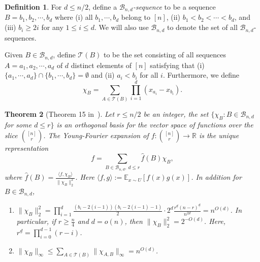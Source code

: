 \documentclass[11pt]{article}
\numberwithin{equation}{section}
\newtheorem{theorem}{Theorem}[section]
\theoremstyle{definition}
\newtheorem{definition}[theorem]{Definition}
\theoremstyle{plain}
\newcommand{\Braket}[1]{\langle#1\rangle}
\begin{document}
%
%
%
%
%
%
%
%
%
%
%

%
%
%
%
%
%
%
%
%
%
%
%
%
%
%
%
\begin{definition}
For $d\leq n/2$, define a \emph{$\mathcal{B}_{n,d}$-sequence} to be a sequence $B=b_1,b_2,\cdots,b_d$ where (i) all $b_1,\cdots,b_d$ belong to $[n]$, (ii) $b_1<b_2<\cdots<b_d$, and (iii) $b_i\geq 2i$ for any $1\leq i\leq d$.
We will also use $\mathcal{B}_{n,d}$ to denote the set of all  $\mathcal{B}_{n,d}$-sequences.  

Given $B\in\mathcal{B}_{n,d}$, define $\mathcal{T}(B)$ to be the set consisting of all sequences $A=a_1,a_2,\cdots,a_d$ of $d$ distinct elements of $[n]$ satisfying that (i) $\{a_1,\cdots,a_d\}\cap \{b_1,\cdots,b_d\}=\emptyset$ and (ii) $a_i<b_i$ for all $i$. Furthermore, we define
\begin{equation} 
\chi_B=\sum_{A\in \mathcal{T}(B)} \prod_{i=1}^d(x_{a_i}-x_{b_i}).
\end{equation} %
\end{definition}
%
\begin{theorem}[Theorem 15 in~\cite{Filmus}]\label{thm:def} %
Let $r\leq n/2$ be an integer, the set $\{\chi_B:B\in \mathcal{B}_{n,d}$ for some $d\leq r \}$ is an orthogonal basis for the vector space of functions over the slice 
%
$\binom{[n]}{r}$. %
The Young-Fourier expansion of $f:
%
\binom{[n]}{r} %
\rightarrow \mathbb{R}$ is the unique representation
%
\begin{equation} %
f=\sum_{B\in \mathcal{B}_{n,d},\ d\leq r}\hat{f}(B)\chi_B,
%
\end{equation} %
where $\hat{f}(B)=\frac{\Braket{f,\chi_B}}{\|\chi_{B}\|_2^2}$. Here $\Braket{f,g}:=\mathbb{E}_{x\sim U}[f(x)g(x)]$. In addition for $B\in \mathcal{B}_{n,d}$,
\begin{enumerate}
  \item $\| \chi_{B}\|_2^2=\prod_{i=1}^{d}\frac{(b_i-2(i-1))(b_i-2(i-1)-1)}{2}\cdot 2^d\frac{r^{\underline{d}}(n-r)^{\underline{d}}}{n^{\underline{2d}}}=n^{O(d)}$. In particular, if $r\geq \frac{n}{4}$ and $d=o(n)$, then %
  $\|\chi_{B}\|_2^2=2^{-O(d)}$. %
  Here, $r^{\underline{d}}=\prod_{i=0}^{d-1}(r-i)$.
  \item $\| \chi_{B}\|_{\infty}\leq\sum_{A\in \mathcal{T}(B)}\|\chi_{A,B}\|_{\infty}=n^{O(d)}$. %
\end{enumerate}
\end{theorem}
\end{document}
